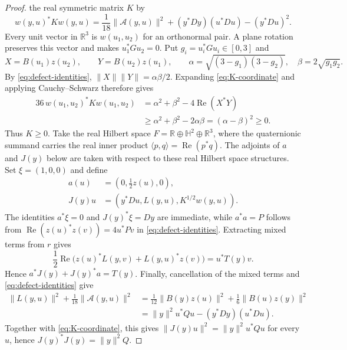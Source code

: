 \documentclass[10pt,a4paper]{amsart}
\begin{document}
\begin{proof}
the real symmetric matrix $K$ by
\begin{equation}\label{eq:K-coordinate}
 w(y,u)^*Kw(y,u)=\frac1{18}\|\mathcal A(y,u)\|^2
 +(y^*Dy)(u^*Du)-(y^*Du)^2.
\end{equation}
Every unit vector in $\mathbb R^3$ is $w(u_1,u_2)$ for an orthonormal
pair.  A plane rotation preserves this vector and makes $u_1^*Gu_2=0$.
Put $g_i=u_i^*Gu_i\in[0,3]$ and
\[
 X=B(u_1)z(u_2),\qquad Y=B(u_2)z(u_1),\qquad
 \alpha=\sqrt{(3-g_1)(3-g_2)},\quad \beta=2\sqrt{g_1g_2}.
\]
By \eqref{eq:defect-identities},
$\|X\|\|Y\|=\alpha\beta/2$.  Expanding
\eqref{eq:K-coordinate} and applying Cauchy--Schwarz therefore gives
\[
 \begin{aligned}
 36\,w(u_1,u_2)^*Kw(u_1,u_2)
 &=\alpha^2+\beta^2-4\operatorname{Re}(X^*Y)\\
 &\geqslant\alpha^2+\beta^2-2\alpha\beta
 =(\alpha-\beta)^2\geqslant0.
 \end{aligned}
\]
Thus $K\geqslant0$.  Take the real Hilbert space
$F=\mathbb R\oplus\mathbb H^2\oplus\mathbb R^3$, where the quaternionic
summand carries the real inner product
$\langle p,q\rangle=\operatorname{Re}(p^*q)$.
The adjoints of $a$ and $J(y)$ below are taken with respect to these real
Hilbert space structures.  Set $\xi=(1,0,0)$ and define
\[
 \begin{aligned}
 a(u)&=(0,\tfrac12z(u),0),\\
 J(y)u&=(y^*Du,L(y,u),K^{1/2}w(y,u)).
 \end{aligned}
\]
The identities $a^*\xi=0$ and $J(y)^*\xi=Dy$ are immediate, while
$a^*a=P$ follows from
$\operatorname{Re}(z(u)^*z(v))=4u^*Pv$ in \eqref{eq:defect-identities}.
Extracting mixed terms from $r$ gives
\[
 \frac12\operatorname{Re}\bigl(z(u)^*L(y,v)
 +L(y,u)^*z(v)\bigr)
 =u^*T(y)v.
\]
Hence $a^*J(y)+J(y)^*a=T(y)$.  Finally, cancellation of the mixed terms
and \eqref{eq:defect-identities} give
\[
 \begin{aligned}
 \|L(y,u)\|^2+\frac1{18}\|\mathcal A(y,u)\|^2
 &=\frac1{12}\|B(y)z(u)\|^2+\frac16\|B(u)z(y)\|^2\\
 &=\|y\|^2u^*Qu-(y^*Dy)(u^*Du).
 \end{aligned}
\]
Together with \eqref{eq:K-coordinate}, this gives
$\|J(y)u\|^2=\|y\|^2u^*Qu$ for every $u$, hence
$J(y)^*J(y)=\|y\|^2Q$.
\end{proof}
\end{document}
